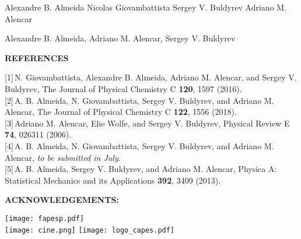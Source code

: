 \documentclass[a0,portrait,16pt]{a0poster}
\begin{document}
{{Alexandre B. Almeida 
Nicolas Giovambattista 
Sergey V. Buldyrev
Adriano M. Alencar
 
 Alexandre B. Almeida, Adriano M. Alencar, Sergey V. Buldyrev


\begin{center}   
\textsf{\LARGE{\textbf{\textcolor[RGB]{77,134,66}{REFERENCES}}}}
\end{center}
\small{[1]\,N. Giovambattista, Alexandre B. Almeida, Adriano M. Alencar, and Sergey V. Buldyrev, The Journal of Physical Chemistry C {\bf 120}, 1597 (2016).}\\
\small{[2]\,A. B. Almeida, N. Giovambattista, Sergey V. Buldyrev, and Adriano M. Alencar, The Journal of Physical Chemistry C {\bf 122}, 1556 (2018).}\\
\small{[3]\,Adriano M. Alencar, Elie Wolfe, and Sergey V. Buldyrev, Physical Review E {\bf 74}, 026311 (2006).}\\
\small{[4]\,A. B. Almeida, N. Giovambattista, Sergey V. Buldyrev, and Adriano M. Alencar, \textit{ to be submitted in July}.}\\
\small{[5]\,A. B. Almeida, Sergey V. Buldyrev, and Adriano M. Alencar, Physica A: Statistical Mechanics and its Applications {\bf 392}, 3409 (2013).}\\



\begin{center}   
	\textsf{\LARGE{\textbf{\textcolor[RGB]{77,134,66}{ACKNOWLEDGEMENTS:}}}}
\end{center}
\vspace{1cm}
	\begin{center}
		\texttt{[image: fapesp.pdf]}\\
		\texttt{[image: cine.png]}	
		\texttt{[image: logo\_capes.pdf]}		
	\end{center}



}}
\end{document}
